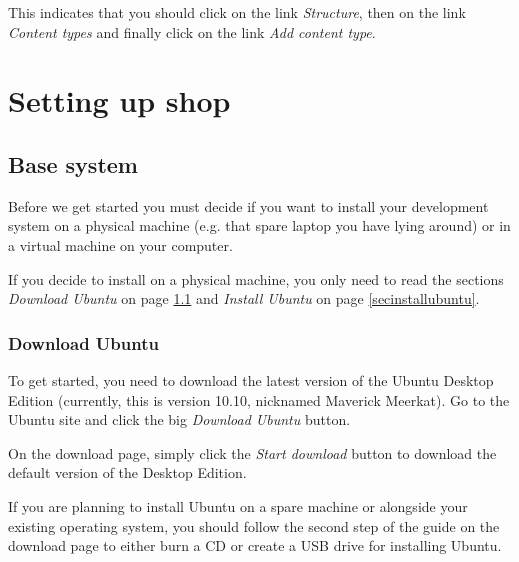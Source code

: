 \documentclass[ebook,10pt,twoside,openright]{memoir}
\begin{document}
This indicates that you should click on the link \emph{Structure}, then on the link \emph{Content types} and finally click on the link \emph{Add content type}.


\endgroup

\mainmatter

\part{Setting up shop}

\chapter{Base system} \label{chbasesystem}

\noindent
Before we get started you must decide if you want to install your development system on a physical machine (e.g. that spare laptop you have lying around) or in a virtual machine on your computer.

If you decide to install on a physical machine, you only need to read the sections \emph{Download Ubuntu} on page \ref{secdownloadubuntu} and \emph{Install Ubuntu} on page \ref{secinstallubuntu}.

\section{Download Ubuntu} \label{secdownloadubuntu}

To get started, you need to download the latest version of the Ubuntu Desktop Edition (currently, this is version 10.10, nicknamed Maverick Meerkat). Go to the Ubuntu site and click the big \emph{Download Ubuntu} button.


On the download page, simply click the \emph{Start download} button to download the default version of the Desktop Edition.


If you are planning to install Ubuntu on a spare machine or alongside your existing operating system, you should follow the second step of the guide on the download page to either burn a CD or create a USB drive for installing Ubuntu.
\end{document}
